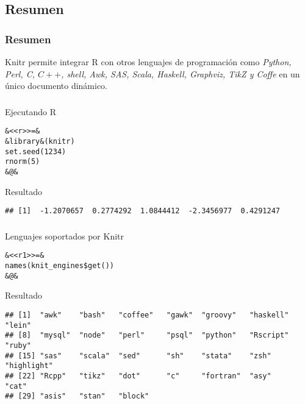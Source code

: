 \documentclass[11pt]{beamer}					%
\begin{document}
	\subsection{Resumen}	
		\begin{frame}[fragile]						%
				\frametitle{Resumen}
				\begin{block}{}
Knitr permite integrar R con otros lenguajes de programación como \textit{Python, Perl, C, $C++$, shell, Awk, SAS, Scala, Haskell, Graphviz, TikZ y Coffe} en un único documento dinámico.
				\end{block}
				\frametitle{}	
				\begin{block}{Ejecutando R}
					\begin{tiny}\begin{lstlisting}[frame=single,style=base]				
&<<r>>=&
&library&(knitr)
set.seed(1234)
rnorm(5)
&@&
				\end{lstlisting}	\end{tiny}
				\end{block}	
				\begin{block}{Resultado}
					\begin{tiny}\begin{lstlisting}[frame=single,style=base]				
## [1]  -1.2070657  0.2774292  1.0844412  -2.3456977  0.4291247
				\end{lstlisting}	\end{tiny}
				\end{block}	
			\end{frame}	
\begin{frame}[fragile]	
			
			\frametitle{}	
				\begin{block}{Lenguajes soportados por Knitr}
					\begin{tiny}\begin{lstlisting}[frame=single,style=base]				
&<<r1>>=&
names(knit_engines$get())
&@&

				\end{lstlisting}	\end{tiny}
				\end{block}	
				\begin{block}{Resultado}
					\begin{tiny}\begin{lstlisting}[frame=single,style=base]				
## [1]  "awk"    "bash"   "coffee"   "gawk"  "groovy"   "haskell"   "lein"
## [8]  "mysql"  "node"   "perl"     "psql"  "python"   "Rscript"   "ruby"
## [15] "sas"    "scala"  "sed"      "sh"    "stata"    "zsh"       "highlight"
## [22] "Rcpp"   "tikz"   "dot"      "c"     "fortran"  "asy"       "cat"
## [29] "asis"   "stan"   "block"
				\end{lstlisting}	\end{tiny}
				\end{block}	
			
\end{frame}				
			
\end{document}
